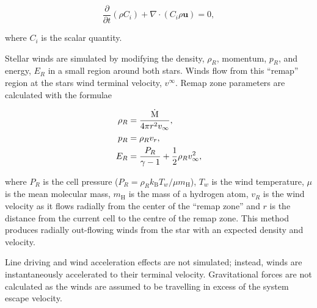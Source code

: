 
\begin{equation}
  \frac{\partial}{\partial t} \left( \rho C_i \right) + \nabla \cdot \left( C_i \rho \mathbf{u} \right) = 0 ,
\end{equation}

\noindent
where $C_i$ is the scalar quantity.

Stellar winds are simulated by modifying the density, $\rho_R$, momentum, $p_R$, and energy, $E_R$ in a small region around both stars.
Winds flow from this ``remap'' region at the stars wind terminal velocity, $v^\infty$. Remap zone parameters are calculated with the formulae

\begin{subequations}
  \begin{align}
    \rho_R & = \frac{\dot{\text{M}}}{4 \pi r^2 v_\infty} , \\
    p_R    & = \rho_R v_{r} , \\
    E_R    & = \frac{P_R}{\gamma - 1} + \frac{1}{2} \rho_R v_\infty^2 ,
  \end{align}
\end{subequations}

\noindent
where $P_R$ is the cell pressure ($P_R = \rho_R k_\text{B} T_w / \mu m_\text{H}$), $T_w$ is the wind temperature, $\mu$ is the mean molecular mass, $m_\text{H}$ is the mass of a hydrogen atom, $v_R$ is the wind velocity as it flows radially from the center of the ``remap zone'' and $r$ is the distance from the current cell to the centre of the remap zone.
This method produces radially out-flowing winds from the star with an expected density and velocity.

Line driving and wind acceleration effects are not simulated;
instead, winds are instantaneously accelerated to their terminal velocity.
Gravitational forces are not calculated as the winds are assumed to be travelling in excess of the system escape velocity.


